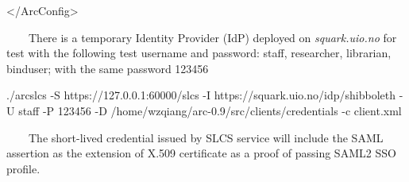\documentclass{article}
\begin{document}
{\ttfamily\color{black}
{\textless}/ArcConfig{\textgreater} }

{\color{black}
\ \ \ \ There is a temporary Identity Provider (IdP) deployed on
\textit{squark.uio.no} for test with the following test username and
password: staff, researcher, librarian, binduser; with the same
password {\textquotedbl}123456{\textquotedbl}}

{\color{black}
./arcslcs -S https://127.0.0.1:60000/slcs -I
https://squark.uio.no/idp/shibboleth -U staff -P 123456 -D
/home/wzqiang/arc-0.9/src/clients/credentials -c client.xml}

{\upshape\color{black}
\ \ \ \ The short-lived credential issued by SLCS service will include
the SAML assertion as the extension of X.509 certificate as a proof of
passing SAML2 SSO profile.}
\end{document}
